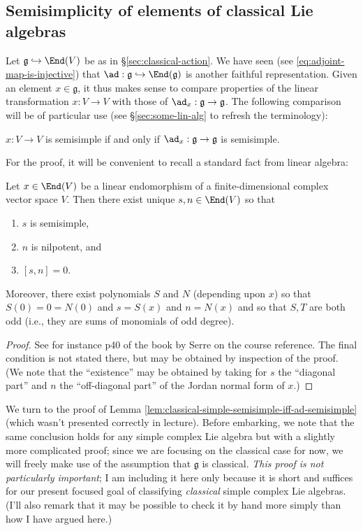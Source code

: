 \documentclass[reqno]{amsart} 
\begin{document}
\subsection{Semisimplicity of elements of classical Lie algebras}
\label{sec:org00974ae}
Let $\mathfrak{g} \hookrightarrow \End(V)$ be as in \S\ref{sec:classical-action}.  We have seen (see \eqref{eq:adjoint-map-is-injective}) that $\ad : \mathfrak{g} \hookrightarrow \End(\mathfrak{g})$ is another faithful representation.  Given an element $x \in \mathfrak{g}$, it thus makes sense to compare properties of the linear transformation $x : V \rightarrow V$ with those of $\ad_x : \mathfrak{g} \rightarrow \mathfrak{g}$.  The following comparison will be of particular use (see \S\ref{sec:some-lin-alg} to refresh the terminology):
\begin{lemma}\label{lem:classical-simple-semisimple-iff-ad-semisimple}
  $x : V \rightarrow V$ is semisimple if and only if $\ad_x : \mathfrak{g} \rightarrow \mathfrak{g}$ is semisimple.
\end{lemma}
For the proof, it will be convenient to recall a standard fact from linear algebra:
\begin{theorem}\label{thm:jordan-decomp}
  Let $x \in \End(V)$ be a linear endomorphism of a finite-dimensional complex vector space $V$.  Then there exist unique $s,n \in \End(V)$ so that
  \begin{enumerate}
  \item $s$ is semisimple,
  \item $n$ is nilpotent, and
  \item $[s,n] = 0$.
  \end{enumerate}
  Moreover, there exist polynomials $S$ and $N$ (depending upon $x$) so that $S(0) = 0 = N(0)$ and $s = S(x)$ and $n = N(x)$ and so that $S,T$ are both odd (i.e., they are sums of monomials of odd degree).
\end{theorem}
\begin{proof}
  See for instance p40 of the book by Serre on the course reference.  The final condition is not stated there, but may be obtained by inspection of the proof.  (We note that the ``existence'' may be obtained by taking for $s$ the ``diagonal part'' and $n$ the ``off-diagonal part'' of the Jordan normal form of $x$.)
\end{proof}

We turn to the proof of Lemma \ref{lem:classical-simple-semisimple-iff-ad-semisimple} (which wasn't presented correctly in lecture).  Before embarking, we note that the same conclusion holds for any simple complex Lie algebra but with a slightly more complicated proof; since we are focusing on the classical case for now, we will freely make use of the assumption that $\mathfrak{g}$ is classical.  \emph{This proof is not particularly important}; I am including it here only because it is short and suffices for our present focused goal of classifying \emph{classical} simple complex Lie algebras.  (I'll also remark that it may be possible to check it by hand more simply than how I have argued here.)
\end{document}
